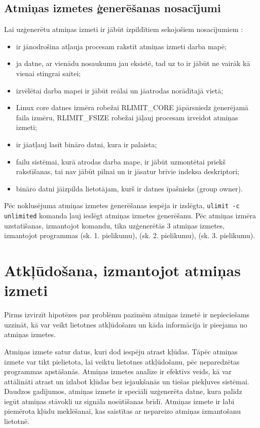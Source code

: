 \subsection{Atmiņas izmetes ģenerēšanas nosacījumi}
Lai  uzģenerētu atmiņas izmeti ir jābūt izpildītiem sekojošiem nosacījumiem \cite {nosacijumi}:
\begin{itemize}
	\item   ir jānodrošina atļauja procesam rakstīt atmiņas izmeti darba mapē;
	\item 	ja datne, ar vienādu nosaukumu jau eksistē, tad uz to ir jābūt ne vairāk kā vienai stingrai saitei;
	\item 	izvēlētai darba mapei ir jābūt reālai un jāatrodas norādītajā vietā;
	\item 	Linux core datnes izmēra robežai {RLIMIT\_CORE} jāpārsniedz ģenerējamā faila izmēru, { RLIMIT\_FSIZE} robežai jāļauj procesam izveidot atmiņas izmeti;
	\item 	ir  jāatļauj lasīt bināro datni, kura ir palaista;
	\item 	failu sistēmai, kurā atrodas darba mape, ir jābūt uzmontētai priekš rakstīšanas, tai nav jābūt pilnai un ir jāsatur brīvie indeksa deskriptori;
	\item 	bināro datni jāizpilda lietotājam, kurš ir datnes īpašnieks (group owner).
\end{itemize} 
 
 Pēc noklusējuma atmiņas izmetes ģenerēšanas iespēja ir izslēgta,  \texttt{ulimit -c unlimited} komanda ļauj ieslēgt atmiņas izmetes ģenerēšanu.
 Pēc atmiņas izmēra uzstatīšanas, izmantojot komandu,  tika uzģenerētās 3 atmiņas izmetes, izmantojot programmas (sk. 1. pielikumu), (sk. 2. pielikumu), (sk. 3. pielikumu).

 


 
 
\section{Atkļūdošana, izmantojot atmiņas izmeti}
Pirms izvirzīt hipotēzes par problēmu pazīmēm atmiņas izmetē ir nepieciešams uzzināt, kā var veikt lietotnes atkļūdošanu un kāda informācija ir pieejama  no atmiņas izmetes.

Atmiņas izmete satur datus, kuri dod iespēju atrast kļūdas. Tāpēc atmiņas izmete var tikt pielietota, lai veiktu lietotnes atkļūdošanu, pēc neparedzētas programmas apstāšanās.
Atmiņas izmetes analīze ir efektīvs veids, kā var attālināti atrast un izlabot kļūdas bez iejaukšanās un tiešas piekļuves sistēmai.
Daudzos gadījumos, atmiņas izmete ir speciāli uzģenerēta datne, kura palīdz iegūt atmiņas stāvokli uz signāla nosūtīšanas brīdī.
Atmiņas izmete ir labi piemērota kļūdu meklēšanai, kas saistītas ar nepareizo atmiņas izmantošanu lietotnē.

